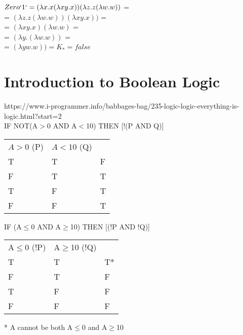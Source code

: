 \documentclass[11pt]{article}
\begin{document}
\begin{center}
$Zero `1` = (\lambda x.x (\lambda xy.x)) (\lambda z.z (\lambda w.w))$ = \\
= $(\lambda z.z (\lambda w.w))(\lambda xy.x))$ = \\
= $(\lambda xy.x) (\lambda w.w)$ = \\
= $(\lambda y. (\lambda w.w)) $ = \\
= $(\lambda yw.w)) = K_* = false $
\end{center}

\clearpage
\section*{Introduction to Boolean Logic}
https://www.i-programmer.info/babbages-bag/235-logic-logic-everything-is-logic.html?start=2 \\

IF NOT(A$>$0 AND A$<$10) THEN [!(P AND Q)]

\begin{center}\begin{tabular}{l l l}
$A>0$ (P) & $A<10$ (Q) & \\
T & T & F \\
F & T & T \\
T & F & T \\
F & F & T
\end{tabular}\end{center}

IF (A$\le$0 AND A$\ge$10) THEN [(!P AND !Q)]

\begin{center}\begin{tabular}{l l l}
A$\le$0 (!P) & A$\ge$10 (!Q) & \\
T & T & T* \\
F & T & F \\
T & F & F \\
F & F & F
\end{tabular}\end{center}

* A cannot be both A$\le$0 and A$\ge$10
\end{document}
